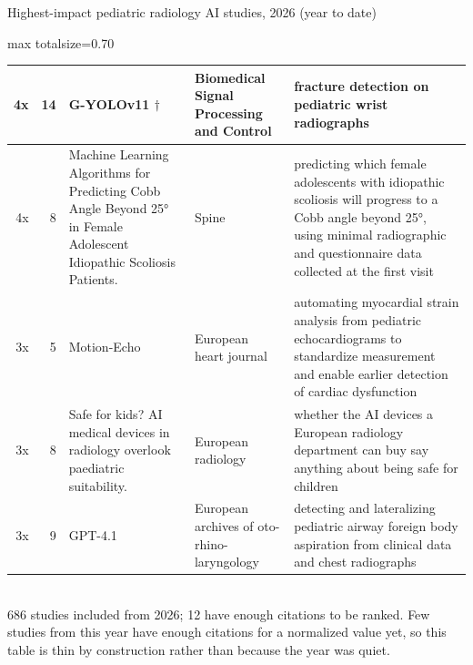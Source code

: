 \documentclass[aspectratio=169]{beamer}
\begin{document}
\begin{frame}[category=Journals/Preprints]{Highest-impact pediatric radiology AI studies, 2026 (year to date)}
\begin{adjustbox}{max totalsize={\textwidth}{0.70\textheight}}
\begin{tabular}{|r|r|>{\raggedright\arraybackslash}p{}|>{\raggedright\arraybackslash}p{}|>{\raggedright\arraybackslash}p{}|}
4x & 14 & G-YOLOv11 $\dagger$ & Biomedical Signal Processing and Control & fracture detection on pediatric wrist radiographs \\ \hline
4x & 8 & Machine Learning Algorithms for Predicting Cobb Angle Beyond 25° in Female Adolescent Idiopathic Scoliosis Patients. & Spine & predicting which female adolescents with idiopathic scoliosis will progress to a Cobb angle beyond 25°, using minimal radiographic and questionnaire data collected at the first visit \\ \hline
3x & 5 & Motion-Echo & European heart journal & automating myocardial strain analysis from pediatric echocardiograms to standardize measurement and enable earlier detection of cardiac dysfunction \\ \hline
3x & 8 & Safe for kids? AI medical devices in radiology overlook paediatric suitability. & European radiology & whether the AI devices a European radiology department can buy say anything about being safe for children \\ \hline
3x & 9 & GPT-4.1 & European archives of oto-rhino-laryngology & detecting and lateralizing pediatric airway foreign body aspiration from clinical data and chest radiographs \\ \hline
\end{tabular}
\end{adjustbox}
\\[2pt]
{\tiny 686 studies included from 2026; 12 have enough citations to be ranked. Few studies from this year have enough citations for a normalized value yet, so this table is thin by construction rather than because the year was quiet.}
\end{frame}
\end{document}
